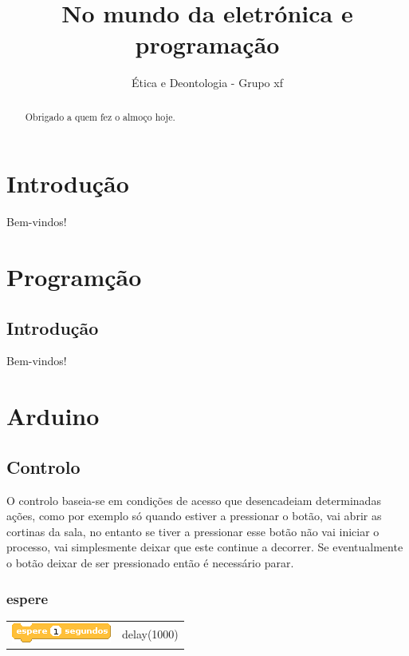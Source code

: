 \documentclass{article}
\begin{document}
\title{No mundo da eletrónica e programação}
\author{Ética e Deontologia - Grupo xf}

\maketitle

\begin{abstract}
Obrigado a quem fez o almoço hoje.
\end{abstract}

\pagebreak
\tableofcontents
\pagebreak

\section{Introdução}
Bem-vindos!

\section{Programção}

\subsection{Introdução}
Bem-vindos!

\section{Arduino}

\subsection{Controlo}
O controlo baseia-se em condições de acesso que desencadeiam determinadas ações, como por exemplo só quando estiver a pressionar o botão, vai abrir as cortinas da sala, no entanto se tiver a pressionar esse botão não vai iniciar o processo, vai simplesmente deixar que este continue a decorrer. Se eventualmente o botão deixar de ser pressionado então é necessário parar.

\subsubsection{espere}
\begin{tabular}{ c c }
    \includegraphics{imgs/controlers/espere} & delay(1000) \\
\end{tabular}
\end{document}
